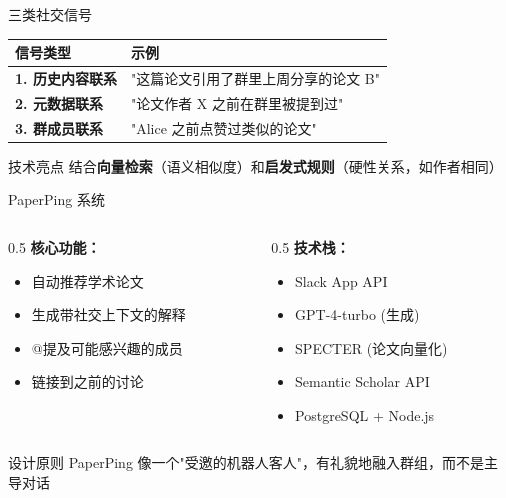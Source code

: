 \documentclass[UTF8,aspectratio=169]{ctexbeamer}
\begin{document}
\begin{frame}{三类社交信号}
\begin{table}
\small
\begin{tabular}{ll}
\toprule
\textbf{信号类型} & \textbf{示例} \\
\midrule
\textbf{1. 历史内容联系} & "这篇论文引用了群里上周分享的论文 B" \\
\textbf{2. 元数据联系} & "论文作者 X 之前在群里被提到过" \\
\textbf{3. 群成员联系} & "Alice 之前点赞过类似的论文" \\
\bottomrule
\end{tabular}
\end{table}

\vspace{0.5cm}

\begin{alertblock}{技术亮点}
结合\textbf{向量检索}（语义相似度）和\textbf{启发式规则}（硬性关系，如作者相同）
\end{alertblock}
\end{frame}

\begin{frame}{PaperPing 系统}
\begin{columns}[T]
\begin{column}{0.5\textwidth}
\textbf{核心功能：}
\begin{itemize}
\item 自动推荐学术论文
\item 生成带社交上下文的解释
\item @提及可能感兴趣的成员
\item 链接到之前的讨论
\end{itemize}
\end{column}
\begin{column}{0.5\textwidth}
\textbf{技术栈：}
\begin{itemize}
\item Slack App API
\item GPT-4-turbo (生成)
\item SPECTER (论文向量化)
\item Semantic Scholar API
\item PostgreSQL + Node.js
\end{itemize}
\end{column}
\end{columns}

\vspace{0.5cm}

\begin{block}{设计原则}
PaperPing 像一个\textcolor{myblue}{"受邀的机器人客人"}，有礼貌地融入群组，而不是主导对话
\end{block}
\end{frame}
\end{document}
